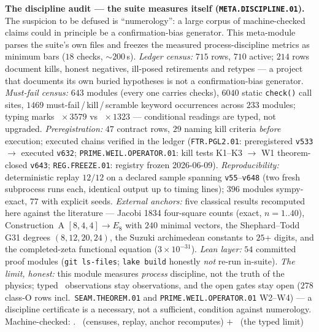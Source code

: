 \documentclass[11pt,a4paper]{article}
\theoremstyle{definition}
\begin{document}
\par\smallskip\noindent\textbf{The discipline audit --- the suite measures
itself (\texttt{META.DISCIPLINE.01}).}
The suspicion to be defused is ``numerology'': a large corpus of
machine-checked claims could in principle be a confirmation-bias
generator.  This meta-module parses the suite's own files and freezes
the measured process-discipline metrics as minimum bars ($18$ checks,
${\sim}200$\,s).  \emph{Ledger census:} $715$ rows, $710$ active;
$214$ rows document kills, honest negatives, ill-posed retirements and
retypes --- a project that documents its own buried hypotheses is not a
confirmation-bias generator.  \emph{Must-fail census:} $643$ modules
(every one carries checks), $6040$ static \texttt{check()} call sites,
$1469$ must-fail\,/\,kill\,/\,scramble keyword occurrences across
$233$ modules; typing marks \mE~$\times\,3579$ vs \mC~$\times\,1323$
--- conditional readings are typed, not upgraded.
\emph{Preregistration:} $47$ contract rows, $29$ naming kill criteria
\emph{before} execution; executed chains verified in the ledger
(\texttt{FTR.PGL2.01}: preregistered \texttt{v533} $\to$ executed
\texttt{v632}; \texttt{PRIME.WEIL.OPERATOR.01}: kill tests K1--K3
$\to$ W1 theorem-closed \texttt{v643}; \texttt{REG.FREEZE.01}: registry
frozen 2026-06-09).  \emph{Reproducibility:} deterministic replay
$12/12$ on a declared sample spanning \texttt{v55}--\texttt{v648}
(two fresh subprocess runs each, identical output up to timing lines);
$396$ modules sympy-exact, $77$ with explicit seeds.  \emph{External
anchors:} five classical results recomputed here against the
literature --- Jacobi 1834 four-square counts (exact, $n=1..40$),
Construction~A $[8,4,4]\to E_8$ with $240$ minimal vectors, the
Shephard--Todd G31 degrees $(8,12,20,24)$, the Suzuki archimedean
constants to $25$+ digits, and the completed-zeta functional equation
($3\times10^{-31}$).  \emph{Lean layer:} $54$ committed proof modules
(\texttt{git ls-files}; \texttt{lake build} honestly \emph{not} re-run
in-suite).  \emph{The limit, honest:} this module measures
\emph{process} discipline, not the truth of the physics; typed \mC\
observations stay observations, and the open gates stay open ($278$
class-O rows incl.\ \texttt{SEAM.THEOREM.01} and
\texttt{PRIME.WEIL.OPERATOR.01} W2--W4) --- a discipline certificate is
a necessary, not a sufficient, condition against numerology.
Machine-checked: .
\mE\ (censuses, replay, anchor recomputes) $+$ \mC\ (the typed limit)
\par\smallskip
\end{document}
